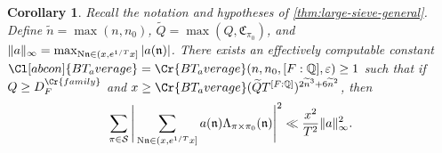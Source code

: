 \documentclass[11pt]{amsart}
\newtheorem{corollary}[theorem]{Corollary}
\theoremstyle{remark}
\numberwithin{equation}{section}
\newcommand{\n}{\mathfrak{n}}
\newcommand{\N}{\textnormal{N}}
\newcommand{\Q}{\mathbb{Q}}
\newcommand{\mS}{\mathcal{S}}
\renewcommand{\tilde}{\widetilde}
\renewcommand{\epsilon}{\varepsilon}
\begin{document}
\begin{corollary}
\label{cor:ls-log-derivative}
Recall the notation and hypotheses of  \cref{thm:large-sieve-general}.  Define $\tilde n = \max(n, n_0)$, $\tilde Q = \max(Q, \mathfrak{C}_{\pi_0})$, and $\|a\|_\infty = \max_{\N \n \in (x, e^{1/T} x]} |a(\n)|$.  There exists an effectively computable constant $\Cl[abcon]{BT_average}=\Cr{BT_average}(n,n_0,[F:\Q],\epsilon)\geq 1$ such that if $Q\geq D_F^{\Cr{family}}$ and $x \geq \Cr{BT_average} (\tilde{Q}T^{[F:\Q]})^{2\tilde{n}^3 + 6\tilde{n}^2}$, then
\[
\begin{aligned}
    \sum_{\pi \in \mS}
    \Bigg| \sum_{\N \n \in (x, e^{1/T} x]} a(\n) \Lambda_{\pi \times \pi_0}(\n) \Bigg|^2
    \ll 
    \frac{x^2}{T^2} \|a\|_\infty^2.
\end{aligned}
\]
\end{corollary}
\end{document}

